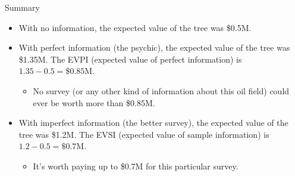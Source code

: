 \documentclass{beamer}\usepackage[]{graphicx}\usepackage[]{color}
\begin{document}
\begin{darkframes}
    \begin{frame}{Summary}
      \begin{itemize}[<+->]
        \item With no information, the expected value of the tree was \$0.5M.
        \item With perfect information (the psychic), the expected value of the tree was \$1.35M. The EVPI (expected value of perfect information) is $1.35 - 0.5 = \$0.85$M.
        \begin{itemize}
          \item No survey (or any other kind of information about this oil field) could ever be worth more than \$0.85M.
        \end{itemize}
        \item With imperfect information (the better survey), the expected value of the tree was \$1.2M. The EVSI (expected value of sample information) is $1.2 - 0.5 = \$0.7$M.
        \begin{itemize}
          \item It's worth paying up to \$0.7M for this particular survey.
        \end{itemize}

      \end{itemize}
    \end{frame}
  \end{darkframes}
\end{document}
